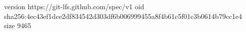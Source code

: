 version https://git-lfs.github.com/spec/v1
oid sha256:4ec43ef1dce2df834542d303df6b006999455a8f4b61c5f01c3b0614b79cc1e4
size 9465
